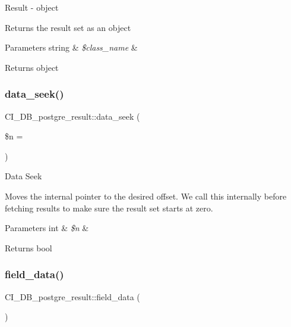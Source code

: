 Result -\/ object

Returns the result set as an object


\begin{DoxyParams}[1]{Parameters}
string & {\em \$class\+\_\+name} & \\
\hline
\end{DoxyParams}
\begin{DoxyReturn}{Returns}
object 
\end{DoxyReturn}
\mbox{\label{class_c_i___d_b__postgre__result_a6596ba5122deba5a7e0599ea7535939d}} 
\subsubsection{\texorpdfstring{data\+\_\+seek()}{data\_seek()}}
{\footnotesize\ttfamily C\+I\+\_\+\+D\+B\+\_\+postgre\+\_\+result\+::data\+\_\+seek (\begin{DoxyParamCaption}\item[{}]{\$n = {} }\end{DoxyParamCaption})}

Data Seek

Moves the internal pointer to the desired offset. We call this internally before fetching results to make sure the result set starts at zero.


\begin{DoxyParams}[1]{Parameters}
int & {\em \$n} & \\
\hline
\end{DoxyParams}
\begin{DoxyReturn}{Returns}
bool 
\end{DoxyReturn}
\mbox{\label{class_c_i___d_b__postgre__result_a3791773029bdf1d93f439ca4246a4549}} 
\subsubsection{\texorpdfstring{field\+\_\+data()}{field\_data()}}
{\footnotesize\ttfamily C\+I\+\_\+\+D\+B\+\_\+postgre\+\_\+result\+::field\+\_\+data (\begin{DoxyParamCaption}{ }\end{DoxyParamCaption})}

